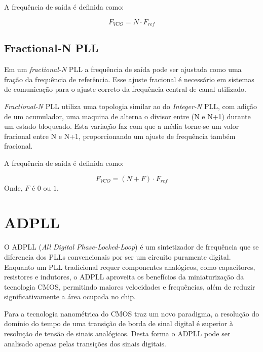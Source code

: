 A frequência de saída é definida como:

\begin{equation}
	F_{VCO} = N \cdot F_{ref}
	\label{eq:fvco_integer_PLL}
\end{equation}



\subsection{Fractional-N PLL}
Em um \textit{fractional-N} PLL a frequência de saída pode ser ajustada como uma fração da frequência de referência. Esse ajuste fracional é necessário em sistemas de comunicação para o ajuste correto da frequência central de canal utilizado. 

\textit{Fractional-N} PLL utiliza uma topologia similar ao do \textit{Integer-N} PLL, com adição de um acumulador, uma maquina de alterna o divisor entre (N e N+1) durante um estado bloqueado. Esta variação faz com que a média torne-se um valor fracional entre N e N+1, proporcionando um ajuste de frequência também fracional. 

A frequência de saída é definida como:

\begin{equation}
	F_{VCO} = (N + F) \cdot F_{ref}
	\label{eq:fvco_fractional_PLL}
\end{equation}
Onde, $F$ é $0$ ou $1$. 

\section{ADPLL}

O ADPLL (\textit{All Digital Phase-Locked-Loop}) é um sintetizador de frequência que se diferencia dos PLLs convencionais por ser um circuito puramente digital. Enquanto um PLL tradicional requer componentes analógicos, como capacitores, resistores e indutores, o ADPLL aproveita os benefícios da miniaturização da tecnologia CMOS, permitindo maiores velocidades e frequências, além de reduzir significativamente a área ocupada no chip.

Para \cite{staszewski2006all} a tecnologia nanométrica do CMOS traz um novo paradigma, a resolução do domínio do tempo de uma transição de borda de sinal digital é superior à resolução de tensão de sinais analógicos. Desta forma o ADPLL pode ser analisado apenas pelas transições dos sinais digitais.

